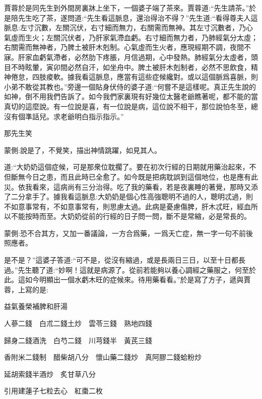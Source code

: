 \begin{parag}
    賈蓉於是同先生到外間房裏牀上坐下，一個婆子端了茶來。賈蓉道:“先生請茶。”於是陪先生吃了茶，遂問道:“先生看這脈息，還治得治不得？”先生道:“看得尊夫人這脈息:左寸沉數，左關沉伏，右寸細而無力，右關需而無神。其左寸沉數者，乃心氣虛而生火；左關沉伏者，乃肝家氣滯血虧。右寸細而無力者，乃肺經氣分太虛；右關需而無神者，乃脾土被肝木剋制。心氣虛而生火者，應現經期不調，夜間不寐。肝家血虧氣滯者，必然肋下疼脹，月信過期，心中發熱。肺經氣分太虛者，頭目不時眩暈，寅卯間必然自汗，如坐舟中。脾土被肝木剋制者，必然不思飲食，精神倦怠，四肢痠軟。據我看這脈息，應當有這些症候纔對。或以這個脈爲喜脈，則小弟不敢從其教也。”旁邊一個貼身伏侍的婆子道:“何嘗不是這樣呢。真正先生說的如神，倒不用我們告訴了。如今我們家裏現有好幾位太醫老爺瞧著呢，都不能的當真切的這麼說。有一位說是喜，有一位說是病，這位說不相干，那位說怕冬至，總沒有個準話兒。求老爺明白指示指示。”
\end{parag}


\begin{parag}
    那先生笑\begin{note}蒙側:說是了，不覺笑，描出神情跳躍，如見其人。\end{note}道:“大奶奶這個症候，可是那衆位耽擱了。要在初次行經的日期就用藥治起來，不但斷無今日之患，而且此時已全愈了。如今既是把病耽誤到這個地位，也是應有此災。依我看來，這病尚有三分治得。吃了我的藥看，若是夜裏睡的著覺，那時又添了二分拿手了。據我看這脈息:大奶奶是個心性高強聰明不過的人，聰明忒過，則不如意事常有，不如意事常有，則思慮太過。此病是憂慮傷脾，肝木忒旺，經血所以不能按時而至。大奶奶從前的行經的日子問一問，斷不是常縮，必是常長的。\begin{note}蒙側:恐不合其方，又加一番議論，一方合爲藥，一爲夭亡症，無一字一句不前後照應者。\end{note}是不是？”這婆子答道:“可不是，從沒有縮過，或是長兩日三日，以至十日都長過。”先生聽了道:“妙啊！這就是病源了。從前若能夠以養心調經之藥服之，何至於此。這如今明顯出一個水虧木旺的症候來。待用藥看看。”於是寫了方子，遞與賈蓉，上寫的是:
\end{parag}


\begin{qute2sp}
    益氣養榮補脾和肝湯


    人蔘二錢　白朮二錢土炒　雲苓三錢　熟地四錢


    歸身二錢酒洗　白芍二錢　川芎錢半　黃芪三錢


    香附米二錢制　醋柴胡八分　懷山藥二錢炒　真阿膠二錢蛤粉炒


    延胡索錢半酒炒　炙甘草八分


    引用建蓮子七粒去心　紅棗二枚
\end{qute2sp}


